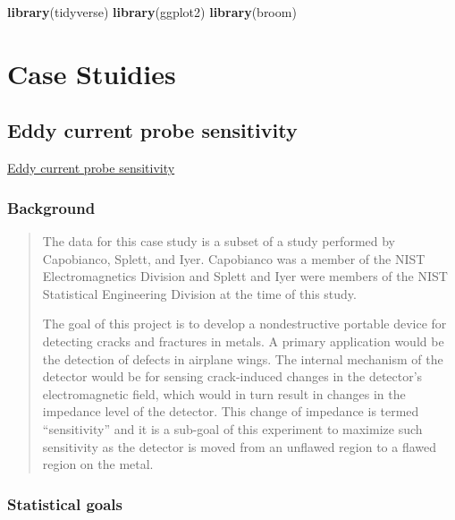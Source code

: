 \documentclass[]{book}
\newenvironment{Shaded}{\begin{snugshade}}{\end{snugshade}}
\newcommand{\KeywordTok}[1]{\textcolor[rgb]{0.13,0.29,0.53}{\textbf{#1}}}
\newcommand{\NormalTok}[1]{#1}
\theoremstyle{definition}
\theoremstyle{definition}
\theoremstyle{definition}
\theoremstyle{remark}
\begin{document}
\begin{Shaded}
\begin{Highlighting}[]
\KeywordTok{library}\NormalTok{(tidyverse)}
\KeywordTok{library}\NormalTok{(ggplot2)}
\KeywordTok{library}\NormalTok{(broom)}
\end{Highlighting}
\end{Shaded}

\hypertarget{case-stuidies-1}{%
\section{Case Stuidies}\label{case-stuidies-1}}

\hypertarget{eddy-current-probe-sensitivity}{%
\subsection{Eddy current probe
sensitivity}\label{eddy-current-probe-sensitivity}}

\href{https://www.itl.nist.gov/div898/handbook/pri/section6/pri61.htm}{Eddy
current probe sensitivity}

\hypertarget{background}{%
\subsubsection{Background}\label{background}}

\begin{quote}
The data for this case study is a subset of a study performed by
Capobianco, Splett, and Iyer. Capobianco was a member of the NIST
Electromagnetics Division and Splett and Iyer were members of the NIST
Statistical Engineering Division at the time of this study.

The goal of this project is to develop a nondestructive portable device
for detecting cracks and fractures in metals. A primary application
would be the detection of defects in airplane wings. The internal
mechanism of the detector would be for sensing crack-induced changes in
the detector's electromagnetic field, which would in turn result in
changes in the impedance level of the detector. This change of impedance
is termed ``sensitivity'' and it is a sub-goal of this experiment to
maximize such sensitivity as the detector is moved from an unflawed
region to a flawed region on the metal.
\end{quote}

\hypertarget{statistical-goals}{%
\subsubsection{Statistical goals}\label{statistical-goals}}
\end{document}
